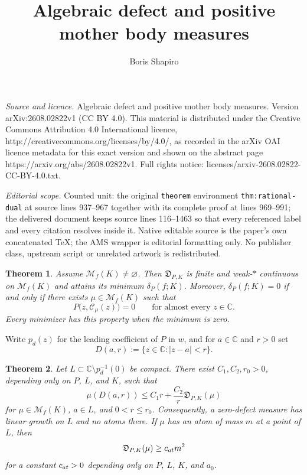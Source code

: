 \documentclass[10pt,a4paper]{amsart}
\newtheorem{theoremalph}{Theorem}
\newcommand{\bC}{\mathbb C}
\newcommand{\M}{\mathcal M}
\newcommand{\Cauchy}{\mathcal C}
\begin{document}
\title[Algebraic defect and positive mother body measures]{Algebraic defect and positive mother body measures}
\author{Boris Shapiro}
\date{}
\maketitle
\noindent\emph{Source and licence.} Algebraic defect and positive mother body measures. Version arXiv:2608.02822v1 (CC BY 4.0). This material is distributed under the Creative Commons Attribution 4.0 International licence, http://creativecommons.org/licenses/by/4.0/, as recorded in the arXiv OAI licence metadata for this exact version and shown on the abstract page https://arxiv.org/abs/2608.02822v1. Full rights notice: licenses/arxiv-2608.02822-CC-BY-4.0.txt.\par\smallskip
\noindent\textit{Editorial scope.} Counted unit: the original \texttt{theorem} environment \texttt{thm:rational-dual} at source lines 937--967 together with its complete proof at lines 969--991; the delivered document keeps source lines 116--1463 so that every referenced label and every citation resolves inside it. Native editable source is the paper's own concatenated TeX; the AMS wrapper is editorial formatting only. No publisher class, upstream script or unrelated artwork is redistributed.
\begin{theoremalph}\label{thmA}
Assume $\M_f(K)\ne\varnothing$.  Then $\mathfrak D_{P,K}$ is finite and
weak-$*$ continuous on $\M_f(K)$ and attains its minimum
$\delta_P(f;K)$.  Moreover, $\delta_P(f;K)=0$ if and only if there exists
$\mu\in\M_f(K)$ such that
\[
 P\bigl(z,\Cauchy_\mu(z)\bigr)=0
 \qquad\text{for almost every }z\in\bC.
\]
Every minimizer has this property when the minimum is zero.
\end{theoremalph}


Write $p_d(z)$ for the leading coefficient of $P$ in $w$, and for $a\in\bC$
and $r>0$ set
\[
 D(a,r):=\{z\in\bC:|z-a|<r\}.
\]

\begin{theoremalph}\label{thmB}
Let $L\subset\bC\setminus p_d^{-1}(0)$ be compact.  There exist
$C_1,C_2,r_0>0$, depending only on $P$, $L$, and $K$, such that
\begin{equation}\label{eq:intro-concentration}
 \mu(D(a,r))\le C_1r+\frac{C_2}{r}\mathfrak D_{P,K}(\mu)
\end{equation}
for $\mu\in\M_f(K)$, $a\in L$, and $0<r\le r_0$.  Consequently, a zero-defect
measure has linear growth on $L$ and no atoms there.  If $\mu$ has an atom of
mass $m$ at a point of $L$, then
\[
 \mathfrak D_{P,K}(\mu)\ge c_{\rm at}m^2
\]
for a constant $c_{\rm at}>0$ depending only on $P$, $L$, $K$, and $a_0$.
\end{theoremalph}
\end{document}
